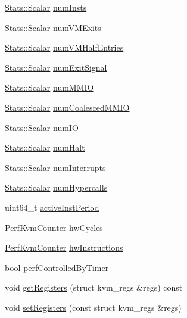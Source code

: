  \begin{DoxyCompactItemize}
\item 
\hyperlink{classStats_1_1Scalar}{Stats::Scalar} \hyperlink{classBaseKvmCPU_a302bf9a6fd3b54c46eb3e2bfb18a320e}{numInsts}
\item 
\hyperlink{classStats_1_1Scalar}{Stats::Scalar} \hyperlink{classBaseKvmCPU_a6184fcde9e075404315cd7c343054d30}{numVMExits}
\item 
\hyperlink{classStats_1_1Scalar}{Stats::Scalar} \hyperlink{classBaseKvmCPU_a8ef83ba51e6ab5f5db813c16e3cebb1d}{numVMHalfEntries}
\item 
\hyperlink{classStats_1_1Scalar}{Stats::Scalar} \hyperlink{classBaseKvmCPU_a6cdcd551476b4e8234d5bfd987218d88}{numExitSignal}
\item 
\hyperlink{classStats_1_1Scalar}{Stats::Scalar} \hyperlink{classBaseKvmCPU_a4030a87068a8b133f5efabfc19f7542d}{numMMIO}
\item 
\hyperlink{classStats_1_1Scalar}{Stats::Scalar} \hyperlink{classBaseKvmCPU_a99a92abe3f29c3d0f59af4e384a8fe7f}{numCoalescedMMIO}
\item 
\hyperlink{classStats_1_1Scalar}{Stats::Scalar} \hyperlink{classBaseKvmCPU_ae3a09de1034e0294f5df0ce66d876727}{numIO}
\item 
\hyperlink{classStats_1_1Scalar}{Stats::Scalar} \hyperlink{classBaseKvmCPU_a65e906b9e123036deb6bc8922ce53e96}{numHalt}
\item 
\hyperlink{classStats_1_1Scalar}{Stats::Scalar} \hyperlink{classBaseKvmCPU_a5ff214621d200e4672d581b12832886a}{numInterrupts}
\item 
\hyperlink{classStats_1_1Scalar}{Stats::Scalar} \hyperlink{classBaseKvmCPU_a230908c23db440bfcee954fb8d72f269}{numHypercalls}
\item 
uint64\_\-t \hyperlink{classBaseKvmCPU_a9b8c93980540464141f0989b8258295b}{activeInstPeriod}
\item 
\hyperlink{classPerfKvmCounter}{PerfKvmCounter} \hyperlink{classBaseKvmCPU_a496c1c0ab30aeafdeeeede34db1edf45}{hwCycles}
\item 
\hyperlink{classPerfKvmCounter}{PerfKvmCounter} \hyperlink{classBaseKvmCPU_ab3360069d449c748e7b9efe5f6d427e9}{hwInstructions}
\item 
bool \hyperlink{classBaseKvmCPU_a569365e1361250361be1c3f703a52914}{perfControlledByTimer}
\item 
void \hyperlink{classBaseKvmCPU_a422ac5896dab3bae0379fa65831e3778}{getRegisters} (struct kvm\_\-regs \&regs) const 
\item 
void \hyperlink{classBaseKvmCPU_a104d34588afdf9e14607bad09f01bd53}{setRegisters} (const struct kvm\_\-regs \&regs)

\end{DoxyCompactItemize}

